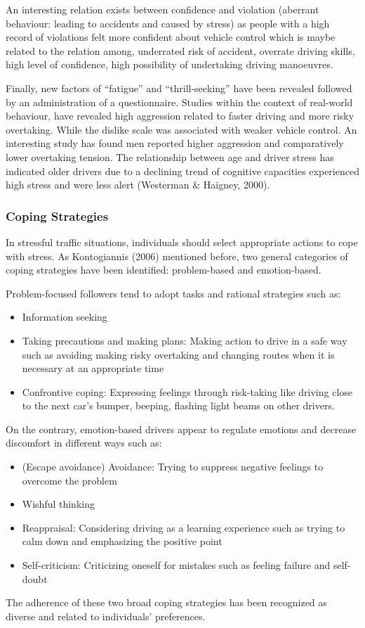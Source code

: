 \documentclass[
11pt, %
oneside, %
english, %
singlespacing, %
]{macthesis} %
\begin{document}
An interesting relation exists between confidence and violation (aberrant behaviour: leading to accidents and caused by stress) as people with a high record of violations felt more confident about vehicle control which is maybe related to the relation among, underrated risk of accident, overrate driving skills, high level of confidence, high possibility of undertaking driving manoeuvres.

Finally, new factors of ``fatigue'' and ``thrill-seeking'' have been revealed followed by an administration of a questionnaire. Studies within the context of real-world behaviour, have revealed high aggression related to faster driving and more risky overtaking. While the dislike scale was associated with weaker vehicle control. An interesting study has found men reported higher aggression and comparatively lower overtaking tension. The relationship between age and driver stress has indicated older drivers due to a declining trend of cognitive capacities experienced high stress and were less alert (Westerman \& Haigney, 2000).

\hypertarget{coping-strategies}{%
\subsubsection{Coping Strategies}\label{coping-strategies}}

In stressful traffic situations, individuals should select appropriate actions to cope with stress. As Kontogiannis (2006) mentioned before, two general categories of coping strategies have been identified: problem-based and emotion-based.

Problem-focused followers tend to adopt tasks and rational strategies such as:
\begin{itemize}
\item
  Information seeking
\item
  Taking precautions and making plans: Making action to drive in a safe way such as avoiding making risky overtaking and changing routes when it is necessary at an appropriate time
\item
  Confrontive coping: Expressing feelings through risk-taking like driving close to the next car's bumper, beeping, flashing light beams on other drivers.
\end{itemize}
On the contrary, emotion-based drivers appear to regulate emotions and decrease discomfort in different ways such as:
\begin{itemize}
\item
  (Escape avoidance) Avoidance: Trying to suppress negative feelings to overcome the problem
\item
  Wishful thinking
\item
  Reappraisal: Considering driving as a learning experience such as trying to calm down and emphasizing the positive point
\item
  Self-criticism: Criticizing oneself for mistakes such as feeling failure and self-doubt
\end{itemize}
The adherence of these two broad coping strategies has been recognized as diverse and related to individuals' preferences.
\end{document}
